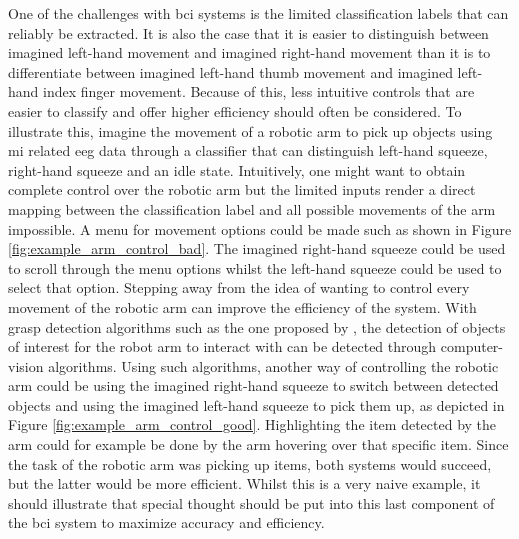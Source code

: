 One of the challenges with \gls{bci} systems is the limited classification labels that can reliably be extracted.
It is also the case that it is easier to distinguish between imagined left-hand movement and imagined right-hand movement than it is to differentiate between imagined left-hand thumb movement and imagined left-hand index finger movement.
Because of this, less intuitive controls that are easier to classify and offer higher efficiency should often be considered.
To illustrate this, imagine the movement of a robotic arm to pick up objects using \gls{mi} related \gls{eeg} data through a classifier that can distinguish left-hand squeeze, right-hand squeeze and an idle state.
Intuitively, one might want to obtain complete control over the robotic arm but the limited inputs render a direct mapping between the classification label and all possible movements of the arm impossible.
A menu for movement options could be made such as shown in Figure \ref{fig:example_arm_control_bad}.
The imagined right-hand squeeze could be used to scroll through the menu options whilst the left-hand squeeze could be used to select that option.
Stepping away from the idea of wanting to control every movement of the robotic arm can improve the efficiency of the system.
With grasp detection algorithms such as the one proposed by \citet{graspnet}, the detection of objects of interest for the robot arm to interact with can be detected through computer-vision algorithms.
Using such algorithms, another way of controlling the robotic arm could be using the imagined right-hand squeeze to switch between detected objects and using the imagined left-hand squeeze to pick them up, as depicted in Figure \ref{fig:example_arm_control_good}.
Highlighting the item detected by the arm could for example be done by the arm hovering over that specific item.
Since the task of the robotic arm was picking up items, both systems would succeed, but the latter would be more efficient.
Whilst this is a very naive example, it should illustrate that special thought should be put into this last component of the \gls{bci} system to maximize accuracy and efficiency.

